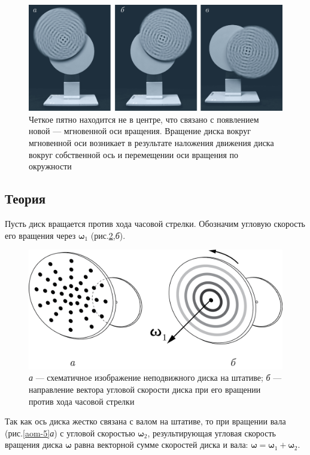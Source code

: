 \documentclass[../../../All.tex]{subfiles}
\begin{document}
\begin{figure}[H]
	\centering 	
	\includegraphics[width=0.9\linewidth]{aom-3.png}
	\caption{Четкое пятно находится не в центре, что связано с появлением новой — мгновенной оси вращения. Вращение диска вокруг мгновенной оси возникает в результате наложения движения диска вокруг собственной ось и перемещении оси вращения по окружности}
	\label{aom-3}
\end{figure}

\subsection*{\textcolor{PineGreen}{Теория}}

Пусть диск вращается против хода часовой стрелки.
Обозначим угловую скорость его вращения через $ \textbf{ω}_1 $ (рис.\ref{aom-4},\textit{б}).

\begin{figure}[H] 
	\centering 	
	\includegraphics[width=0.5\linewidth]{aom-4.png}
	\caption{\textit{а} — схематичное изображение неподвижного диска на штативе; \textit{б} — направление вектора угловой скорости диска при его вращении против хода часовой стрелки}
	\label{aom-4}
\end{figure}

Так как ось диска жестко связана с валом на штативе, то при вращении вала (рис.\ref{aom-5}\textit{а}) с угловой скоростью $ \textbf{ω}_2 $, результирующая угловая скорость вращения диска $\textbf{ω}$ равна векторной сумме скоростей диска и вала: $\textbf{ω} = \textbf{ω}_1 + \textbf{ω}_2$.
\end{document}
